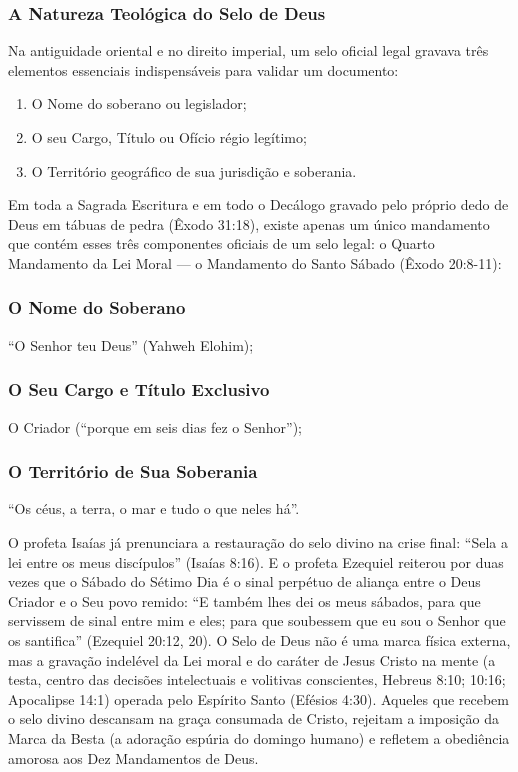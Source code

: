 \documentclass[11pt,a4paper,openany]{book}
\begin{document}
\subsubsection*{A Natureza Teológica do Selo de Deus}
Na antiguidade oriental e no direito imperial, um selo oficial legal gravava três elementos essenciais indispensáveis para validar um documento:
\begin{enumerate}
  \item O Nome do soberano ou legislador;
  \item O seu Cargo, Título ou Ofício régio legítimo;
  \item O Território geográfico de sua jurisdição e soberania.
\end{enumerate}


Em toda a Sagrada Escritura e em todo o Decálogo gravado pelo próprio dedo de Deus em tábuas de pedra (Êxodo 31:18), existe apenas um único mandamento que contém esses três componentes oficiais de um selo legal: o Quarto Mandamento da Lei Moral — o Mandamento do Santo Sábado (Êxodo 20:8-11):

\subsubsection*{O Nome do Soberano}
``O Senhor teu Deus'' (Yahweh Elohim);

\subsubsection*{O Seu Cargo e Título Exclusivo}
O Criador (``porque em seis dias fez o Senhor'');

\subsubsection*{O Território de Sua Soberania}
``Os céus, a terra, o mar e tudo o que neles há''.

O profeta Isaías já prenunciara a restauração do selo divino na crise final: ``Sela a lei entre os meus discípulos'' (Isaías 8:16). E o profeta Ezequiel reiterou por duas vezes que o Sábado do Sétimo Dia é o sinal perpétuo de aliança entre o Deus Criador e o Seu povo remido: ``E também lhes dei os meus sábados, para que servissem de sinal entre mim e eles; para que soubessem que eu sou o Senhor que os santifica'' (Ezequiel 20:12, 20).
O Selo de Deus não é uma marca física externa, mas a gravação indelével da Lei moral e do caráter de Jesus Cristo na mente (a testa, centro das decisões intelectuais e volitivas conscientes, Hebreus 8:10; 10:16; Apocalipse 14:1) operada pelo Espírito Santo (Efésios 4:30). Aqueles que recebem o selo divino descansam na graça consumada de Cristo, rejeitam a imposição da Marca da Besta (a adoração espúria do domingo humano) e refletem a obediência amorosa aos Dez Mandamentos de Deus.
\end{document}
